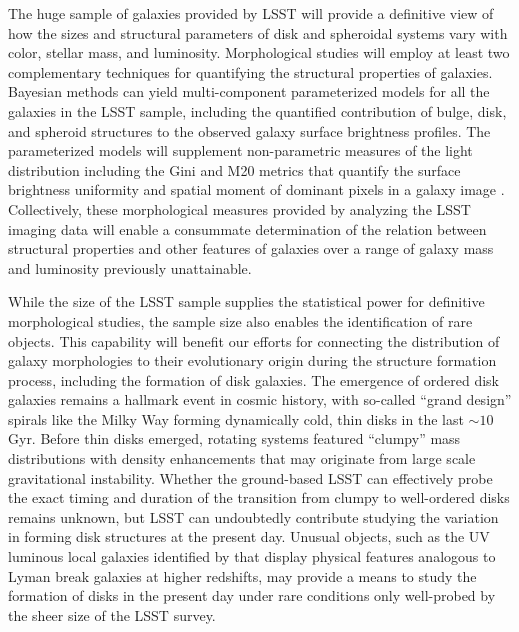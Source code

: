 The huge sample of galaxies provided by LSST will
provide a definitive view of how the sizes and
structural parameters of disk and spheroidal systems
vary with color, stellar mass, and luminosity. 
Morphological studies will employ at least two
complementary techniques for quantifying the 
structural properties of galaxies. Bayesian
methods can yield multi-component
parameterized models for all the galaxies
in the LSST sample, including the quantified
contribution of bulge, disk, and
spheroid structures to the observed galaxy
surface brightness profiles. The parameterized
models will supplement non-parametric measures
of the light distribution including the
Gini and M20 metrics that quantify the surface
brightness uniformity and spatial moment of
dominant pixels in a galaxy image \citep{abraham2003a,lotz2004a}.
Collectively, these morphological measures provided
by analyzing the LSST imaging data will enable
a consummate determination of the relation between
structural properties and other features of
galaxies over a range of galaxy mass and luminosity
previously unattainable.

While the size of the LSST sample supplies the
statistical power for definitive morphological studies,
the sample size also enables the identification of rare
objects. This capability will benefit our efforts for
connecting the distribution of galaxy morphologies to their
evolutionary origin during the structure formation process,
including the formation of disk galaxies.
The emergence of ordered disk galaxies remains a hallmark
event in cosmic history, with so-called ``grand design''
spirals like the Milky Way forming dynamically cold, thin
disks in the last $\sim10$ Gyr. Before thin disks emerged,
rotating systems featured ``clumpy'' mass distributions with
density enhancements
that may originate from large scale gravitational instability.
Whether the ground-based LSST can effectively probe
the exact timing and duration of the transition from
clumpy to well-ordered disks remains 
unknown, but LSST can undoubtedly contribute studying the
variation in forming disk structures at the present day.
Unusual objects, such as the UV luminous local galaxies identified
by \citet{heckman2005a} that display physical features analogous to 
Lyman break galaxies at higher redshifts, may provide a 
means to study the formation of disks in the present day
under rare conditions only well-probed by the sheer size
of the LSST survey.

